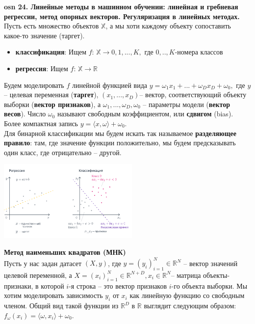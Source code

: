 

\textbf{\LARGE osn 24. Линейные методы в машинном обучении: линейная и гребневая регрессии, метод опорных векторов. Регуляризация в линейных методах. }  \\

Пусть есть множество объектов $\mathbb{X}$, а мы хоти каждому объекту сопоставить какое-то значение (таргет).

\begin{itemize}
    \item \textbf{классификация}: Ищем $f$: $\mathbb{X} \xrightarrow{}0,1,...,K,$ где $0,..,K$-номера классов
    \item \textbf{регрессия}:  Ищем $f$: $\mathbb{X} \xrightarrow{} \mathbb{R}$
\end{itemize}
Будем моделировать $f$ линейной функцией вида $ y = \omega_1x_1+...+\omega_Dx_D+\omega_0,$ где $y$ – целевая переменная (\textbf{таргет}), $(x_1,...,x_D)$– вектор, соответствующий объекту выборки (\textbf{вектор признаков}), а $\omega_1,...,\omega_D,\omega_0$ – параметры модели (\textbf{вектор весов}). Число $\omega_0$ называют свободным коэффициентом, или \textbf{сдвигом} (bias). Более компактная запись $y = \langle{x, \omega}\rangle+\omega_0$. \\
Для бинарной классификации мы будем искать так называемое \textbf{разделяющее правило}: там, где значение функции положительно, мы будем предсказывать один класс, где отрицательно – другой.
\begin{center}
    \includegraphics[height=4cm]{pics/t_osn24_linear_models.png}
\end{center}
\textbf{Метод наименьших квадратов (МНК)} \\
Пусть у нас задан датасет $(X, y)$, где 
$y=(y_i)_{i=1}^N \in \mathbb{R}^{N}$ – вектор значений целевой переменной, а $X=(x_i)_{i=1}^N \in \mathbb{R}^{N+D}, x_i \in \mathbb{R}^{N}$– матрица объекты-признаки, в которой 
$i$-я строка – это вектор признаков 
$i$-го объекта выборки. Мы хотим моделировать зависимость $y_i$ от $x_i$ как линейную функцию со свободным членом. Общий вид такой функции из $\mathbb{R}^D$ в $\mathbb{R}$ выглядит следующим образом: $ f_{\omega}(x_i)=\langle\omega,x_i\rangle+\omega_0$.
